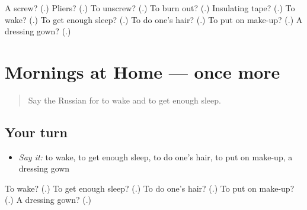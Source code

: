 \begin{tcolorbox}[breakable,colback=teal!4,colframe=teal!35!black,title={Before you move on}]
A screw? (\textbf{}.) Pliers? (\textbf{}.) To unscrew? (\textbf{}.) To burn out? (\textbf{}.) Insulating tape? (\textbf{}.) To wake? (\textbf{}.) To get enough sleep? (\textbf{}.) To do one's hair? (\textbf{}.) To put on make-up? (\textbf{}.) A dressing gown? (\textbf{}.)
\end{tcolorbox}
\section[(dialogue)]{Mornings at Home — once more}

\label{lesson:RU-R534-review-final-534}



\begin{quote}
Say the Russian for to wake and to get enough sleep.
\end{quote}

\subsection*{Your turn}
\begin{itemize}
\raggedright
  \item \emph{Say it:} to wake, to get enough sleep, to do one's hair, to put on make-up, a dressing gown
\end{itemize}

\begin{tcolorbox}[breakable,colback=teal!4,colframe=teal!35!black,title={Before you move on}]
To wake? (\textbf{}.) To get enough sleep? (\textbf{}.) To do one's hair? (\textbf{}.) To put on make-up? (\textbf{}.) A dressing gown? (\textbf{}.)
\end{tcolorbox}
